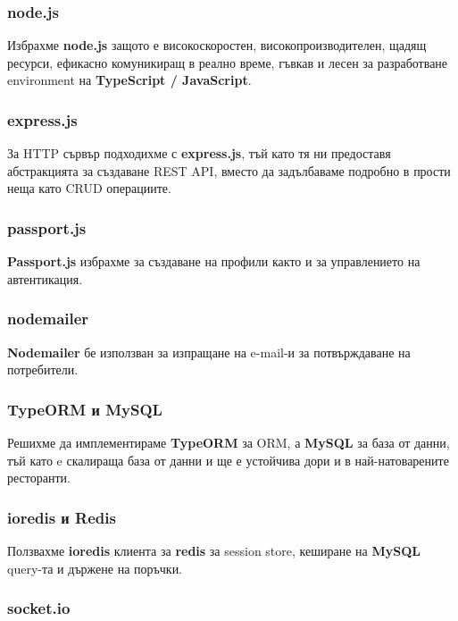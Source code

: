 \documentclass[a4paper]{article}
\begin{document}
\begin{Large}
\subsubsection{node.js}

Избрахме \textbf{node.js} защото е високоскоростен, високопроизводителен, щадящ ресурси, ефикасно комуникиращ в реално време, гъвкав и лесен за разработване environment на \textbf{TypeScript / JavaScript}. 

\subsubsection{express.js}

За HTTP сървър подходихме с \textbf{express.js}, тъй като тя ни предоставя абстракцията за създаване REST API, вместо да задълбаваме подробно в прости неща като CRUD операциите.

\subsubsection{passport.js}

\textbf{Passport.js} избрахме за създаване на профили както и за управлението на автентикация.

\subsubsection{nodemailer}

\textbf{Nodemailer} бе използван за изпращане на e-mail-и за потвърждаване на потребители.

\subsubsection{TypeORM и MySQL}

Решихме да имплементираме \textbf{TypeORM} за ORM, а \textbf{MySQL} за база от данни, тъй като e скалираща база от данни и ще е устойчива дори и в най-натоварените ресторанти.

\subsubsection{ioredis и Redis}

Ползвахме \textbf{ioredis} клиента за \textbf{redis} за session store, кеширане на \textbf{MySQL} query-та и държене на поръчки.

\subsubsection{socket.io}


\end{Large}
\end{document}
